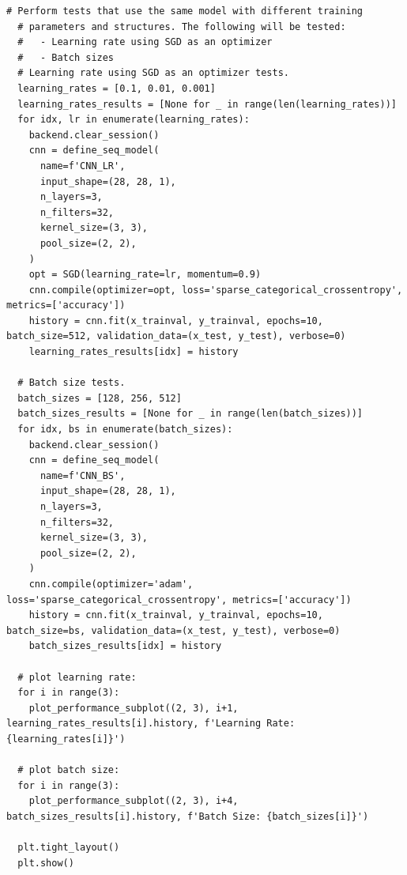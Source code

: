 \documentclass[a4paper]{article}
\begin{document}
\begin{lstlisting}[basicstyle= \scriptsize]
  # Perform tests that use the same model with different training 
  # parameters and structures. The following will be tested:
  #   - Learning rate using SGD as an optimizer
  #   - Batch sizes
  # Learning rate using SGD as an optimizer tests.
  learning_rates = [0.1, 0.01, 0.001]
  learning_rates_results = [None for _ in range(len(learning_rates))]
  for idx, lr in enumerate(learning_rates):
    backend.clear_session()
    cnn = define_seq_model(
      name=f'CNN_LR',
      input_shape=(28, 28, 1),
      n_layers=3,
      n_filters=32,
      kernel_size=(3, 3),
      pool_size=(2, 2),
    )
    opt = SGD(learning_rate=lr, momentum=0.9)
    cnn.compile(optimizer=opt, loss='sparse_categorical_crossentropy', metrics=['accuracy'])
    history = cnn.fit(x_trainval, y_trainval, epochs=10, batch_size=512, validation_data=(x_test, y_test), verbose=0)
    learning_rates_results[idx] = history

  # Batch size tests.
  batch_sizes = [128, 256, 512]
  batch_sizes_results = [None for _ in range(len(batch_sizes))]
  for idx, bs in enumerate(batch_sizes):
    backend.clear_session()
    cnn = define_seq_model(
      name=f'CNN_BS',
      input_shape=(28, 28, 1),
      n_layers=3,
      n_filters=32,
      kernel_size=(3, 3),
      pool_size=(2, 2),
    )
    cnn.compile(optimizer='adam', loss='sparse_categorical_crossentropy', metrics=['accuracy'])
    history = cnn.fit(x_trainval, y_trainval, epochs=10, batch_size=bs, validation_data=(x_test, y_test), verbose=0)
    batch_sizes_results[idx] = history

  # plot learning rate:
  for i in range(3):
    plot_performance_subplot((2, 3), i+1, learning_rates_results[i].history, f'Learning Rate: {learning_rates[i]}')

  # plot batch size:
  for i in range(3):
    plot_performance_subplot((2, 3), i+4, batch_sizes_results[i].history, f'Batch Size: {batch_sizes[i]}')

  plt.tight_layout()
  plt.show()
\end{lstlisting}
\end{document}
